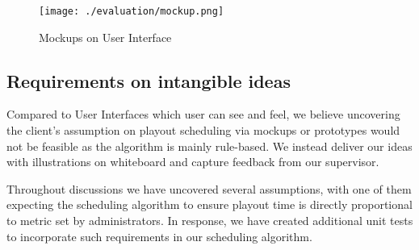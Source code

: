 \documentclass[a4paper]{article}
\begin{document}
\begin{figure}[H]
   \begin{center}
      \texttt{[image: ./evaluation/mockup.png]}
   \end{center}
   \caption{Mockups on User Interface}
   \label{fig:mockup}
\end{figure}

\subsection{Requirements on intangible ideas}
Compared to User Interfaces which user can see and feel, we believe 
uncovering the client's assumption on playout scheduling via mockups or 
prototypes would not be feasible as the algorithm is mainly rule-based.
We instead deliver our ideas with illustrations on whiteboard and
capture feedback from our supervisor.

Throughout discussions we have uncovered several assumptions, with one of them
expecting the scheduling algorithm to ensure playout time is 
directly proportional to metric set by administrators. In response,
we have created additional unit tests to incorporate such requirements 
in our scheduling algorithm.
\end{document}
